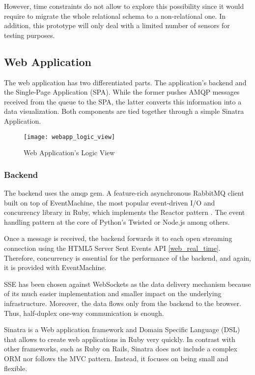 However, time constraints do not allow to explore this possibility since it would require to migrate the whole relational schema to a non-relational one. In addition, this prototype will only deal with a limited number of sensors for testing purposes.

\subsection{Web Application}

The web application has two differentiated parts. The application's backend and the Single-Page Application (SPA). While the former pushes AMQP messages received from the queue to the SPA, the latter converts this information into a data visualization. Both components are tied together through a simple Sinatra Application.

\begin{figure}[h]
	\centering
	\texttt{[image: webapp\_logic\_view]}
	\caption{Web Application's Logic View}
	\label{fig:webapp_logic_view}
\end{figure}

\subsubsection{Backend}

The backend uses the amqp gem. A feature-rich asynchronous RabbitMQ client built on top of EventMachine, the most popular event-driven I/O and concurrency library in Ruby, which implements the Reactor pattern \cite{reactor}. The event handling pattern at the core of Python's Twisted or Node.js among others.

Once a message is received, the backend forwards it to each open streaming connection using the HTML5 Server Sent Events API \ref{web_real_time}. Therefore, concurrency is essential for the performance of the backend, and again, it is provided with EventMachine.

SSE has been chosen against WebSockets as the data delivery mechanism because of its much easier implementation and smaller impact on the underlying infrastructure. Moreover, the data flows only from the backend to the browser. Thus, half-duplex one-way communication is enough.

Sinatra is a Web application framework and Domain Specific Language (DSL) that allows to create web applications in Ruby very quickly. In contrast with other frameworks, such as Ruby on Rails, Sinatra does not include a complex ORM nor follows the MVC pattern. Instead, it focuses on being small and flexible.


